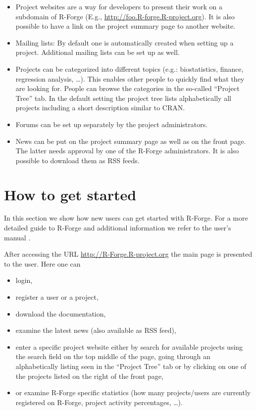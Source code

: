 \begin{itemize}
\item Project websites are a way for developers to present their work
  on a subdomain of R-Forge (E.g.,
  \url{http://foo.R-forge.R-project.org}). It is also possible to 
  have a link on the project summary page to another website. 
\item Mailing lists: By default one is automatically created when setting up a
  project. Additional mailing lists can be set up as well. 
\item Projects can be categorized into different
  topics (e.g.: biostatistics, finance, regression analysis,
  \ldots). This enables other people to quickly find what they are
  looking for. People can browse the categories in the so-called
  ``Project Tree'' tab. In the default setting the project tree lists
  alphabetically all projects including a short description similar to CRAN.
\item Forums can be set up separately by the project
  administrators.%
\item News can be put on the project summary page as well as on the
  front page. The latter needs approval by one of the R-Forge
  administrators. It is also possible to download them as RSS feeds.
\end{itemize}

\section{How to get started}
In this section we show how new users can get started with
R-Forge. For a more detailed guide to R-Forge and additional
information we refer to the user's manual \citep{forge:theussl:2008}.

After accessing the URL \url{http://R-Forge.R-project.org} the main
page is presented to the user. Here one can
\begin{itemize}
\item login,
\item register a user or a project,
\item download the documentation,
\item examine the latest news (also available as RSS feed),
\item enter a specific project website either by search for available
  projects using the search field on the top middle of the page, going
  through an alphabetically listing seen in the
  ``Project Tree'' tab or by clicking on one of the projects listed on
  the right of the front page,
\item or examine R-Forge specific statistics (how many projects/users
  are currently registered on R-Forge, project activity percentages,
  \ldots{}).
\end{itemize}

